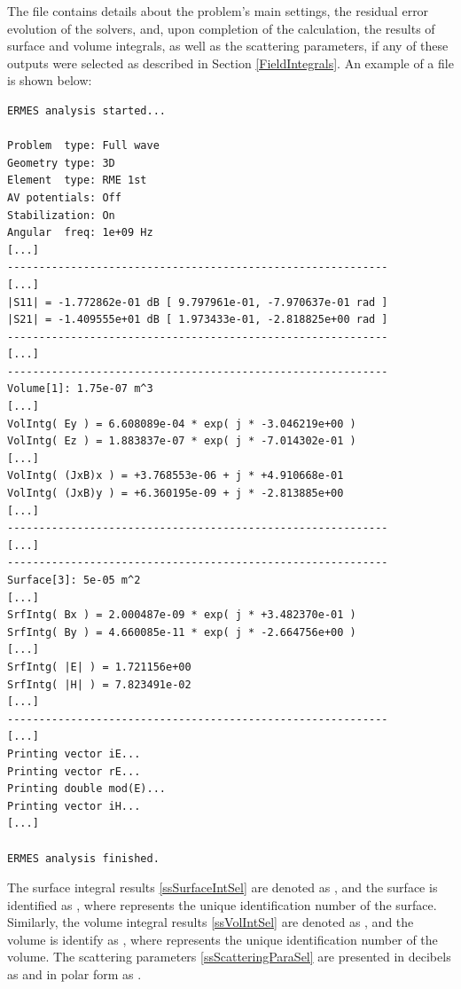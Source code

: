 The  file contains details about the problem's main settings, the residual error evolution of the solvers, and, upon completion of the calculation, the results of surface and volume integrals, as well as the scattering parameters, if any of these outputs were selected as described in Section \ref{FieldIntegrals}. An example of a  file is shown below:
\begin{small}\begin{lstlisting}
ERMES analysis started...

Problem  type: Full wave
Geometry type: 3D
Element  type: RME 1st
AV potentials: Off
Stabilization: On
Angular  freq: 1e+09 Hz
[...]
------------------------------------------------------------
[...]
|S11| = -1.772862e-01 dB [ 9.797961e-01, -7.970637e-01 rad ]
|S21| = -1.409555e+01 dB [ 1.973433e-01, -2.818825e+00 rad ]
------------------------------------------------------------
[...]
------------------------------------------------------------
Volume[1]: 1.75e-07 m^3
[...]
VolIntg( Ey ) = 6.608089e-04 * exp( j * -3.046219e+00 )
VolIntg( Ez ) = 1.883837e-07 * exp( j * -7.014302e-01 )
[...]
VolIntg( (JxB)x ) = +3.768553e-06 + j * +4.910668e-01
VolIntg( (JxB)y ) = +6.360195e-09 + j * -2.813885e+00
[...]
------------------------------------------------------------
[...]
------------------------------------------------------------
Surface[3]: 5e-05 m^2
[...]
SrfIntg( Bx ) = 2.000487e-09 * exp( j * +3.482370e-01 )
SrfIntg( By ) = 4.660085e-11 * exp( j * -2.664756e+00 )
[...]
SrfIntg( |E| ) = 1.721156e+00
SrfIntg( |H| ) = 7.823491e-02
[...]
------------------------------------------------------------
[...]
Printing vector iE...
Printing vector rE...
Printing double mod(E)...
Printing vector iH...
[...]

ERMES analysis finished.
\end{lstlisting}\end{small} 
The surface integral results \ref{ssSurfaceIntSel} are denoted as , and the surface is identified as , where  represents the unique identification number of the surface. Similarly, the volume integral results \ref{ssVolIntSel} are denoted as , and the volume is identify as , where  represents the unique identification number of the volume. The scattering parameters \ref{ssScatteringParaSel} are presented in decibels as  and in polar form as .

